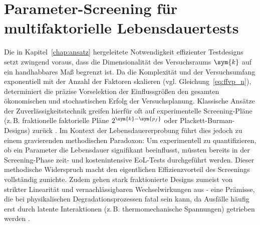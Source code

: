 
\chapter{Parameter-Screening für multifaktorielle Lebensdauertests} \label{chap:screening}

Die in Kapitel~\ref{chap:ansatz} hergeleitete Notwendigkeit effizienter Testdesigns setzt zwingend voraus, dass die Dimensionalität des Versuchsraums $\sym{k}$ auf ein handhabbares Maß begrenzt ist.
Da die Komplexität und der Versuchsumfang exponentiell mit der Anzahl der Faktoren skalieren (vgl. Gleichung~\eqref{eq:ffvp_n}), determiniert die präzise Vorselektion der Einflussgrößen den gesamten ökonomischen und stochastischen Erfolg der Versuchsplanung.
Klassische Ansätze der Zuverlässigkeitstechnik greifen hierfür oft auf experimentelle Screening-Pläne (z.\,B. fraktionelle faktorielle Pläne $2^{\sym{k}-\sym{p_f}}$ oder Plackett-Burman-Designs) zurück \cite{Kleppmann.2020,Rigdon.2022}.
Im Kontext der Lebensdauererprobung führt dies jedoch zu einem gravierenden methodischen Paradoxon:
Um experimentell zu quantifizieren, ob ein Parameter die Lebensdauer signifikant beeinflusst, müssten bereits in der Screening-Phase zeit- und kostenintensive \ac{EoL}-Tests durchgeführt werden.
Dieser methodische Widerspruch macht den eigentlichen Effizienzvorteil des Screenings vollständig zunichte.
Zudem gehen stark fraktionierte Designs zumeist von strikter Linearität und vernachlässigbaren Wechselwirkungen aus - eine Prämisse, die bei physikalischen Degradationsprozessen fatal sein kann, da Ausfälle häufig erst durch latente Interaktionen (z.\,B. thermomechanische Spannungen) getrieben werden \cite{Modarres.2017}.


